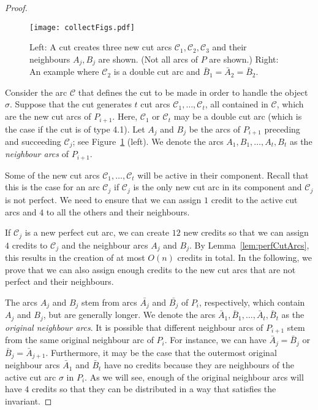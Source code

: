 \documentclass{article}
\newcommand{\PP}{P}
\newcommand{\se}{\sigma}
\newcommand{\cut}{\mathcal C}
\newcommand{\arcA}{A}
\newcommand{\arcB}{B}
\begin{document}
\begin{proof}
\begin{figure}
\centering
\texttt{[image: collectFigs.pdf]}
\caption{Left: A cut creates three new cut arcs $\cut_1,\cut_2,\cut_3$ and their neighbours $\arcA_j,\arcB_j$ are shown. (Not all arcs of $\PP$ are shown.)
Right: An example where $\cut_2$ is a double cut arc and $\bar\arcB_1=\bar\arcA_2=\bar\arcB_2$.}
\label{fig:arcAB}
\end{figure}

Consider the arc $\cut$ that defines the cut to be made in order to handle the object $\se$.
Suppose that the cut generates $t$ cut arcs $\cut_1,\ldots,\cut_t$, all contained in $\cut$, which are the new cut arcs of $\PP_{i+1}$.
Here, $\cut_1$ or $\cut_t$ may be a double cut arc (which is the case if the cut is of type 4.1).
Let $\arcA_j$ and $\arcB_j$ be the arcs of $\PP_{i+1}$ preceding and succeeding $\cut_j$; see Figure~\ref{fig:arcAB} (left).
We denote the arcs $\arcA_1,\arcB_1,\ldots,\arcA_t,\arcB_t$ as the \emph{neighbour arcs} of $\PP_{i+1}$.

Some of the new cut arcs $\cut_1,\ldots,\cut_t$ will be active in their component.
Recall that this is the case for an arc $\cut_j$ if $\cut_j$ is the only new cut arc in its component and $\cut_j$ is not perfect.
We need to ensure that we can assign $1$ credit to the active cut arcs and $4$ to all the others and their neighbours.

If $\cut_j$ is a new perfect cut arc, we can create $12$ new credits so that we can assign $4$ credits to $\cut_j$ and the neighbour arcs $\arcA_j$ and $\arcB_j$.
By Lemma~\ref{lem:perfCutArcs}, this results in the creation of at most $O(n)$ credits in total.
In the following, we prove that we can also assign enough credits to the new cut arcs that are not perfect and their neighbours.

The arcs $\arcA_j$ and $\arcB_j$ stem from arcs $\bar{\arcA_j}$ and $\bar{\arcB_j}$ of $\PP_i$, respectively, which contain $\arcA_j$ and $\arcB_j$, but are generally longer.
We denote the arcs $\bar\arcA_1,\bar\arcB_1,\ldots,\bar\arcA_t,\bar\arcB_t$ as the \emph{original neighbour arcs}.
It is possible that different neighbour arcs of $\PP_{i+1}$ stem from the same original neighbour arc of $\PP_i$.
For instance, we can have $\bar\arcA_j=\bar\arcB_j$ or $\bar\arcB_j=\bar\arcA_{j+1}$.
Furthermore, it may be the case that the outermost original neighbour arcs $\bar\arcA_1$ and $\bar\arcB_t$ have no credits because they are neighbours of the active cut arc $\se$ in $\PP_i$.
As we will see, enough of the original neighbour arcs will have $4$ credits so that they can be distributed in a way that satisfies the invariant.


\end{proof}
\end{document}
